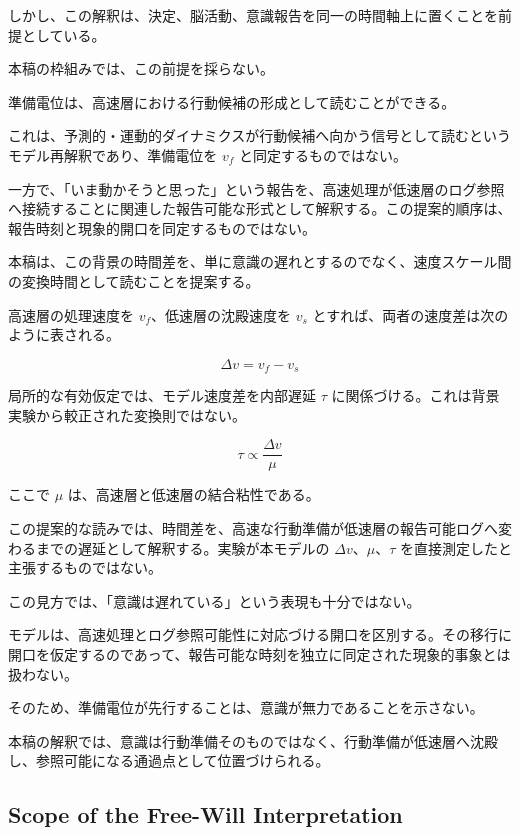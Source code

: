 しかし、この解釈は、決定、脳活動、意識報告を同一の時間軸上に置くことを前提としている。

本稿の枠組みでは、この前提を採らない。

準備電位は、高速層における行動候補の形成として読むことができる。

これは、予測的・運動的ダイナミクスが行動候補へ向かう信号として読むというモデル再解釈であり、準備電位を $v_f$ と同定するものではない。

一方で、「いま動かそうと思った」という報告を、高速処理が低速層のログ参照へ接続することに関連した報告可能な形式として解釈する。この提案的順序は、報告時刻と現象的開口を同定するものではない。

本稿は、この背景の時間差を、単に意識の遅れとするのでなく、速度スケール間の変換時間として読むことを提案する。

高速層の処理速度を $v_f$、低速層の沈殿速度を $v_s$ とすれば、両者の速度差は次のように表される。

\begin{equation}
\Delta v = v_f - v_s
\end{equation}

局所的な有効仮定では、モデル速度差を内部遅延 $\tau$ に関係づける。これは背景実験から較正された変換則ではない。

\begin{equation}
\tau \propto \frac{\Delta v}{\mu}
\end{equation}

ここで $\mu$ は、高速層と低速層の結合粘性である。

この提案的な読みでは、時間差を、高速な行動準備が低速層の報告可能ログへ変わるまでの遅延として解釈する。実験が本モデルの $\Delta v$、$\mu$、$\tau$ を直接測定したと主張するものではない。

この見方では、「意識は遅れている」という表現も十分ではない。

モデルは、高速処理とログ参照可能性に対応づける開口を区別する。その移行に開口を仮定するのであって、報告可能な時刻を独立に同定された現象的事象とは扱わない。

そのため、準備電位が先行することは、意識が無力であることを示さない。

本稿の解釈では、意識は行動準備そのものではなく、行動準備が低速層へ沈殿し、参照可能になる通過点として位置づけられる。

\subsection{Scope of the Free-Will Interpretation}

